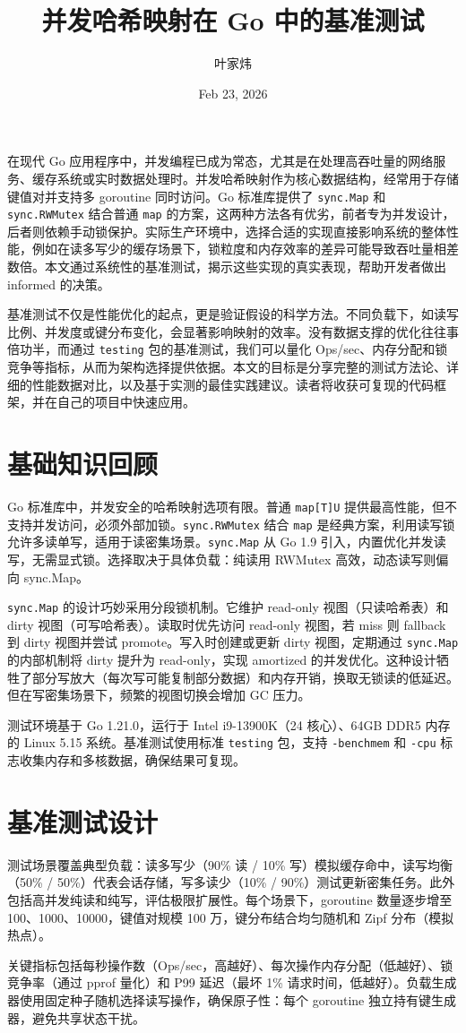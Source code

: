 \title{并发哈希映射在 Go 中的基准测试}
\author{叶家炜}
\date{Feb 23, 2026}
\maketitle
在现代 Go 应用程序中，并发编程已成为常态，尤其是在处理高吞吐量的网络服务、缓存系统或实时数据处理时。并发哈希映射作为核心数据结构，经常用于存储键值对并支持多 goroutine 同时访问。Go 标准库提供了 \texttt{sync.Map} 和 \texttt{sync.RWMutex} 结合普通 \texttt{map} 的方案，这两种方法各有优劣，前者专为并发设计，后者则依赖手动锁保护。实际生产环境中，选择合适的实现直接影响系统的整体性能，例如在读多写少的缓存场景下，锁粒度和内存效率的差异可能导致吞吐量相差数倍。本文通过系统性的基准测试，揭示这些实现的真实表现，帮助开发者做出 informed 的决策。\par
基准测试不仅是性能优化的起点，更是验证假设的科学方法。不同负载下，如读写比例、并发度或键分布变化，会显著影响映射的效率。没有数据支撑的优化往往事倍功半，而通过 \texttt{testing} 包的基准测试，我们可以量化 Ops/sec、内存分配和锁竞争等指标，从而为架构选择提供依据。本文的目标是分享完整的测试方法论、详细的性能数据对比，以及基于实测的最佳实践建议。读者将收获可复现的代码框架，并在自己的项目中快速应用。\par
\chapter{基础知识回顾}
Go 标准库中，并发安全的哈希映射选项有限。普通 \texttt{map[T]U} 提供最高性能，但不支持并发访问，必须外部加锁。\texttt{sync.RWMutex} 结合 \texttt{map} 是经典方案，利用读写锁允许多读单写，适用于读密集场景。\texttt{sync.Map} 从 Go 1.9 引入，内置优化并发读写，无需显式锁。选择取决于具体负载：纯读用 RWMutex 高效，动态读写则偏向 sync.Map。\par
\texttt{sync.Map} 的设计巧妙采用分段锁机制。它维护 read-only 视图（只读哈希表）和 dirty 视图（可写哈希表）。读取时优先访问 read-only 视图，若 miss 则 fallback 到 dirty 视图并尝试 promote。写入时创建或更新 dirty 视图，定期通过 \texttt{sync.Map} 的内部机制将 dirty 提升为 read-only，实现 amortized 的并发优化。这种设计牺牲了部分写放大（每次写可能复制部分数据）和内存开销，换取无锁读的低延迟。但在写密集场景下，频繁的视图切换会增加 GC 压力。\par
测试环境基于 Go 1.21.0，运行于 Intel i9-13900K（24 核心）、64GB DDR5 内存的 Linux 5.15 系统。基准测试使用标准 \texttt{testing} 包，支持 \texttt{-benchmem} 和 \texttt{-cpu} 标志收集内存和多核数据，确保结果可复现。\par
\chapter{基准测试设计}
测试场景覆盖典型负载：读多写少（90\%{} 读 / 10\%{} 写）模拟缓存命中，读写均衡（50\%{} / 50\%{}）代表会话存储，写多读少（10\%{} / 90\%{}）测试更新密集任务。此外包括高并发纯读和纯写，评估极限扩展性。每个场景下，goroutine 数量逐步增至 100、1000、10000，键值对规模 100 万，键分布结合均匀随机和 Zipf 分布（模拟热点）。\par
关键指标包括每秒操作数（Ops/sec，高越好）、每次操作内存分配（低越好）、锁竞争率（通过 pprof 量化）和 P99 延迟（最坏 1\%{} 请求时间，低越好）。负载生成器使用固定种子随机选择读写操作，确保原子性：每个 goroutine 独立持有键生成器，避免共享状态干扰。\par
